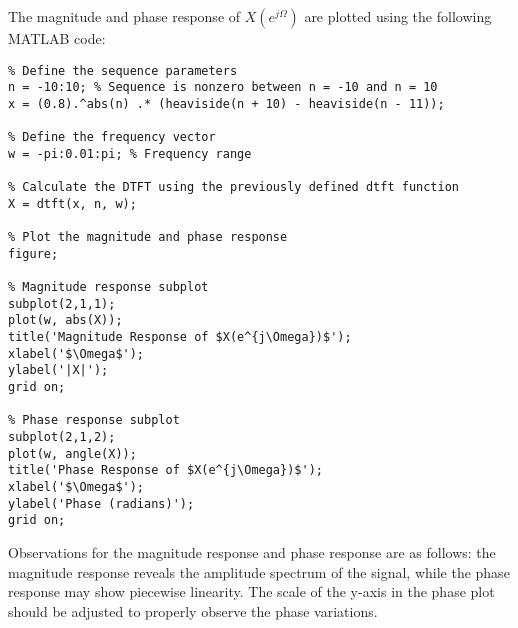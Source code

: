 
\item[(b)]
The magnitude and phase response of $X\left(e^{j \Omega}\right)$ are plotted using the following MATLAB code:

\begin{verbatim}
% Define the sequence parameters
n = -10:10; % Sequence is nonzero between n = -10 and n = 10
x = (0.8).^abs(n) .* (heaviside(n + 10) - heaviside(n - 11));

% Define the frequency vector
w = -pi:0.01:pi; % Frequency range

% Calculate the DTFT using the previously defined dtft function
X = dtft(x, n, w);

% Plot the magnitude and phase response
figure;

% Magnitude response subplot
subplot(2,1,1);
plot(w, abs(X));
title('Magnitude Response of $X(e^{j\Omega})$');
xlabel('$\Omega$');
ylabel('|X|');
grid on;

% Phase response subplot
subplot(2,1,2);
plot(w, angle(X));
title('Phase Response of $X(e^{j\Omega})$');
xlabel('$\Omega$');
ylabel('Phase (radians)');
grid on;
\end{verbatim}

Observations for the magnitude response and phase response are as follows: the magnitude response reveals
the amplitude spectrum of the signal, while the phase response may show piecewise linearity.
The scale of the y-axis in the phase plot should be adjusted to properly observe the phase variations.
